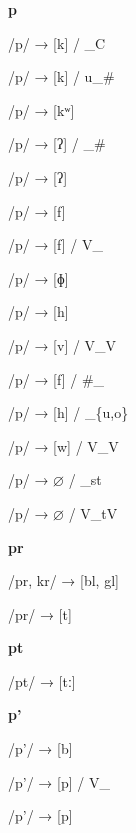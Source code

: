 \begin{center}\textbf{p}\end{center}
\begin{multicols}{4}
\noindent /p/ → [k] / \_C

\noindent /p/ → [k] / u\_\#

\noindent /p/ → [kʷ]

\noindent /p/ → [ʔ] / \_\#

\noindent /p/ → [ʔ]

\noindent /p/ → [f]

\noindent /p/ → [f] / V\_

\noindent /p/ → [ɸ]

\noindent /p/ → [h]

\noindent /p/ → [v] / V\_V

\noindent /p/ → [f] / \#\_

\noindent /p/ → [h] / \_\{u,o\}

\noindent /p/ → [w] / V\_V

\noindent /p/ → $\varnothing$ / \_st

\noindent /p/ → $\varnothing$ / V\_tV
\end{multicols}


\begin{center}\textbf{pr}\end{center}
\begin{multicols}{4}
\noindent /pr, kr/ → [bl, gl]

\noindent /pr/ → [t]
\end{multicols}



\begin{center}\textbf{pt}\end{center}
\begin{multicols}{4}
\noindent /pt/ → [tː]
\end{multicols}


\begin{center}\textbf{p'}\end{center}
\begin{multicols}{4}
\noindent /p'/ → [b]

\noindent /p'/ → [p] / V\_

\noindent /p'/ → [p]
\end{multicols}


